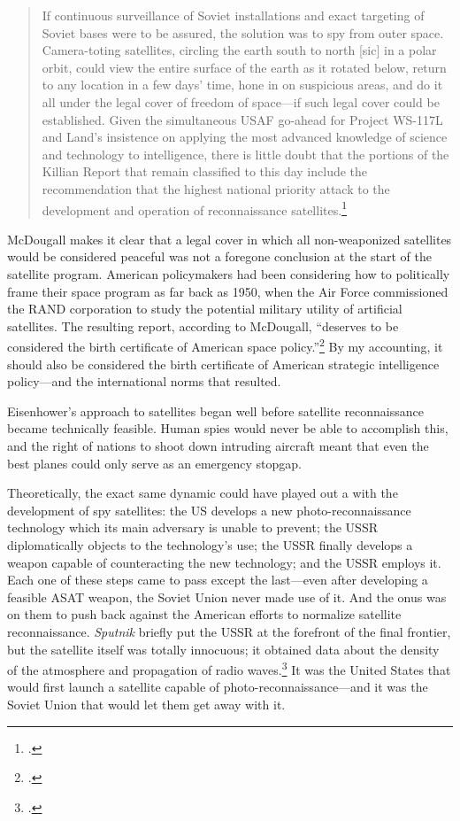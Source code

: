 \documentclass{report}
\begin{document}
\begin{quote}
	If continuous surveillance of Soviet installations and exact targeting of Soviet bases were to be assured, the solution was to spy from outer space. Camera-toting satellites, circling the earth south to north [sic] in a polar orbit, could view the entire surface of the earth as it rotated below, return to any location in a few days' time, hone in on suspicious areas, and do it all under the legal cover of freedom of space---if such legal cover could be established. Given the simultaneous USAF go-ahead for Project WS-117L and Land's insistence on applying the most advanced knowledge of science and technology to intelligence, there is little doubt that the portions of the Killian Report that remain classified to this day include the recommendation that the highest national priority attack to the development and operation of reconnaissance satellites.\footcite[p.~117]{mcdougall_heavens_1985}
\end{quote}

McDougall makes it clear that a legal cover in which all non-weaponized satellites would be considered peaceful was not a foregone conclusion at the start of the satellite program. American policymakers had been considering how to politically frame their space program as far back as 1950, when the Air Force commissioned the RAND corporation to study the potential military utility of artificial satellites. The resulting report, according to McDougall, ``deserves to be considered the birth certificate of American space policy.''\footcite[p.~108]{mcdougall_heavens_1985} By my accounting, it should also be considered the birth certificate of American strategic intelligence policy---and the international norms that resulted.

Eisenhower's approach to satellites began well before satellite reconnaissance became technically feasible.  Human spies would never be able to accomplish this, and the right of nations to shoot down intruding aircraft meant that even the best planes could only serve as an emergency stopgap.


Theoretically, the exact same dynamic could have played out a with the development of spy satellites: the US develops a new photo-reconnaissance technology which its main adversary is unable to prevent; the USSR diplomatically objects to the technology's use; the USSR finally develops a weapon capable of counteracting the new technology; and the USSR employs it. Each one of these steps came to pass except the last---even after developing a feasible ASAT weapon, the Soviet Union never made use of it. And the onus was on them to push back against the American efforts to normalize satellite reconnaissance. \emph{Sputnik} briefly put the USSR at the forefront of the final frontier, but the satellite itself was totally innocuous; it obtained data about the density of the atmosphere and propagation of radio waves.\footcite{nasa_sputnik_2019} It was the United States that would first launch a satellite capable of photo-reconnaissance---and it was the Soviet Union that would let them get away with it.
\end{document}
